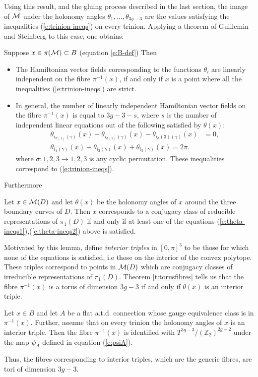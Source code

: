 	Using this result, and the gluing process described in the last section, the image of $\mathcal{M}$ under the holonomy angles $\theta_1,...,\theta_{3g-3}$ are the values satisfying the inequalities (\ref{e:trinion-ineqs}) on every trinion. Applying a theorem of Guillemin and Steinberg \cite{guillemin_gelfand-cetlin_1983} to this case, one obtains:
	\begin{theorem}
		\label{t:torusfibres}
		Suppose $x\in \pi(\mathcal{M}) \subset B$ (equation \ref{e:B-def}) Then
		\begin{itemize}
			\item The Hamiltonian vector fields corresponding to the functions $\theta_i$ are linearly independent on the fibre $\pi^{-1}(x)$, if and only if $x$ is a point where all the inequalities (\ref{e:trinion-ineqs}) are strict.
			\item In general, the number of linearly independent Hamiltonian vector fields on the fibre $\pi^{-1}(x)$ is equal to $3g-3-s$, where $s$ is the number of independent linear equations out of the following satisfied by $\theta(x)$:
				\begin{align}
					\label{e:theta-ineqs1}
					\theta_{i_{\sigma(1)}(\gamma)}(x) + \theta_{i_{\sigma(2)}(\gamma)}(x)-\theta_{i{_\sigma(3)}(\gamma)}(x)&=0,\\
					\theta_{i_1(\gamma)}(x) + \theta_{i_2(\gamma)}(x) + \theta_{i_3(\gamma)}(x) = 2\pi.
					\label{e:theta-ineqs2}
				\end{align}
			where $\sigma:{1,2,3}\to{1,2,3}$ is any cyclic permutation. These inequalities correspond to (\ref{e:trinion-ineqs}).
		\end{itemize}
	\end{theorem}
	Furthermore
	\begin{lemma}
		Let $x\in \mathcal{M}(D)$ and let $\theta(x)$ be the holonomy angles of $x$ around the three boundary curves of $D$. Then $x$ corresponds to a conjugacy class of reducible representations of $\pi_1(D)$ if and only if at least one of the equations (\ref{e:theta-ineqs1}),(\ref{e:theta-ineqs2}) above is satisfied.
	\end{lemma}
	Motivated by this lemma, define \emph{interior triples} in $[0,\pi]^3$ to be those for which none of the equations is satisfied, i.e those on the interior of the convex polytope. These triples correspond to points in $\mathcal{M}(D)$ which are conjugacy classes of irreducible representations of $\pi_1(D)$. Theorem \ref{t:torusfibres} tells us that the fibre $\pi^{-1}(x)$ is a torus of dimension $3g-3$ if and only if $\theta(x)$ is an interior triple.
	\begin{theorem}
		Let $x\in B$ and let $A$ be a flat a.t.d. connection whose gauge equivalence class is in $\pi^{-1}(x)$. Further, assume that on every trinion the holonomy angles of $x$ is an interior triple. Then the fibre $\pi^{-1}(x)$ is identified with $T^{3g-3}/(\mathbb{Z}_2)^{2g-2}$ under the map $\psi_A$ defined in equation (\ref{e:psiA}).
	\end{theorem}
	Thus, the fibres corresponding to interior triples, which are the generic fibres, are tori of dimension $3g-3$. 
	
